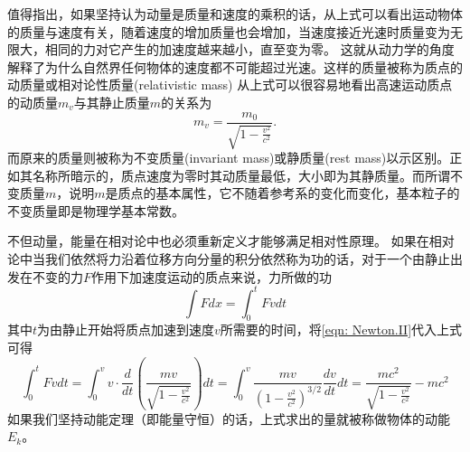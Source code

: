 值得指出，如果坚持认为动量是质量和速度的乘积的话，从上式可以看出运动物体的质量与速度有关，随着速度的增加质量也会增加，当速度接近光速时质量变为无限大，相同的力对它产生的加速度越来越小，直至变为零。
这就从动力学的角度解释了为什么自然界任何物体的速度都不可能超过光速。这样的质量被称为质点的{\heiti 动质量}或{\heiti 相对论性质量}(relativistic mass)
从上式可以很容易地看出高速运动质点的动质量$m_v$与其静止质量$m$的关系为
\begin{equation}
m_v = \frac{m_0}{\sqrt{1- \frac{v^2}{c^2}}}.
\end{equation}
而原来的质量则被称为{\heiti 不变质量}(invariant mass)或{\heiti 静质量}(rest mass)以示区别。正如其名称所暗示的，质点速度为零时其动质量最低，大小即为其静质量。而所谓不变质量$m$，说明$m$是质点的基本属性，它不随着参考系的变化而变化，基本粒子的不变质量即是物理学基本常数。

不但动量，能量在相对论中也必须重新定义才能够满足相对性原理。
如果在相对论中当我们依然将力沿着位移方向分量的积分依然称为功的话，对于一个由静止出发在不变的力$F$作用下加速度运动的质点来说，力所做的功
\begin{equation}
\int F dx = \int_0^t F vdt
\end{equation}
其中$t$为由静止开始将质点加速到速度$v$所需要的时间，将\ref{eqn: Newton.II}代入上式可得
\begin{equation}
\int_0^t F vdt=\int_0^v v \cdot \frac{d}{dt}(\frac{mv}{\sqrt{1-\frac{v^2}{c^2}}})dt=\int_0^v \frac{mv}{(1-\frac{v^2}{c^2})^{3/2}}\frac{dv}{dt}dt=\frac{mc^2}{\sqrt{1-\frac{v^2}{c^2}}}-mc^2
\end{equation}
如果我们坚持动能定理（即能量守恒）的话，上式求出的量就被称做物体的动能$E_k$。

